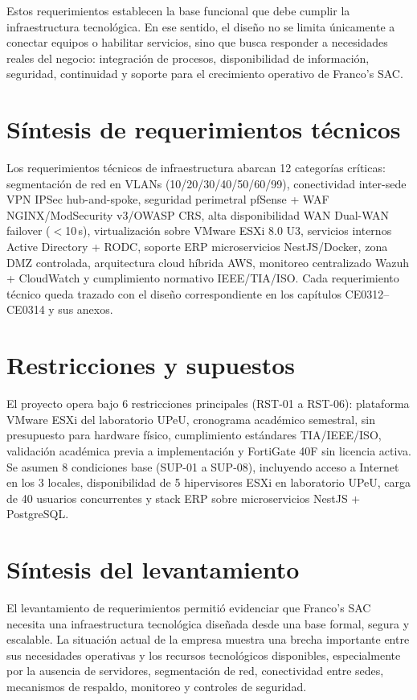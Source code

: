 \documentclass[11pt, a4paper, oneside]{report}
\begin{document}
Estos requerimientos establecen la base funcional que debe cumplir la infraestructura tecnológica. En ese sentido, el diseño no se limita únicamente a conectar equipos o habilitar servicios, sino que busca responder a necesidades reales del negocio: integración de procesos, disponibilidad de información, seguridad, continuidad y soporte para el crecimiento operativo de Franco's SAC.

\section{Síntesis de requerimientos técnicos}

Los requerimientos técnicos de infraestructura abarcan 12 categorías críticas: segmentación de red en VLANs (10/20/30/40/50/60/99), conectividad inter-sede VPN IPSec hub-and-spoke, seguridad perimetral pfSense + WAF NGINX/ModSecurity v3/OWASP CRS, alta disponibilidad WAN Dual-WAN failover ($<$10\,s), virtualización sobre VMware ESXi 8.0 U3, servicios internos Active Directory + RODC, soporte ERP microservicios NestJS/Docker, zona DMZ controlada, arquitectura cloud híbrida AWS, monitoreo centralizado Wazuh + CloudWatch y cumplimiento normativo IEEE/TIA/ISO. Cada requerimiento técnico queda trazado con el diseño correspondiente en los capítulos CE0312--CE0314 y sus anexos.


\section{Restricciones y supuestos}

El proyecto opera bajo 6 restricciones principales (RST-01 a RST-06): plataforma VMware ESXi del laboratorio UPeU, cronograma académico semestral, sin presupuesto para hardware físico, cumplimiento estándares TIA/IEEE/ISO, validación académica previa a implementación y FortiGate 40F sin licencia activa. Se asumen 8 condiciones base (SUP-01 a SUP-08), incluyendo acceso a Internet en los 3 locales, disponibilidad de 5 hipervisores ESXi en laboratorio UPeU, carga de 40 usuarios concurrentes y stack ERP sobre microservicios NestJS + PostgreSQL.


\section{Síntesis del levantamiento}

El levantamiento de requerimientos permitió evidenciar que Franco's SAC necesita una infraestructura tecnológica diseñada desde una base formal, segura y escalable. La situación actual de la empresa muestra una brecha importante entre sus necesidades operativas y los recursos tecnológicos disponibles, especialmente por la ausencia de servidores, segmentación de red, conectividad entre sedes, mecanismos de respaldo, monitoreo y controles de seguridad.
\end{document}
